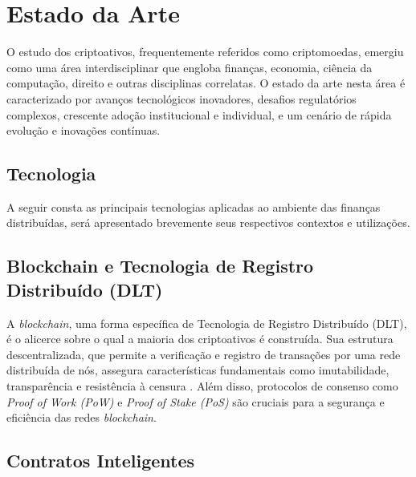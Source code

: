 \chapter{Estado da Arte}
O estudo dos criptoativos, frequentemente referidos como criptomoedas, emergiu como uma área interdisciplinar que engloba finanças, economia, ciência da computação, direito e outras disciplinas correlatas. O estado da arte nesta área é caracterizado por avanços tecnológicos inovadores, desafios regulatórios complexos, crescente adoção institucional e individual, e um cenário de rápida evolução e inovações contínuas.


\section{Tecnologia}
A seguir consta as principais tecnologias aplicadas ao ambiente das finanças distribuídas, será apresentado brevemente seus respectivos contextos e utilizações.

\section*{Blockchain e Tecnologia de Registro Distribuído (DLT)}

A \textit{blockchain}, uma forma específica de Tecnologia de Registro Distribuído (DLT), é o alicerce sobre o qual a maioria dos criptoativos é construída. Sua estrutura descentralizada, que permite a verificação e registro de transações por uma rede distribuída de nós, assegura características fundamentais como imutabilidade, transparência e resistência à censura \cite{Nakamoto2009}. Além disso, protocolos de consenso como \textit{Proof of Work (PoW)} e \textit{Proof of Stake (PoS)} são cruciais para a segurança e eficiência das redes \textit{blockchain}.

\section*{Contratos Inteligentes}

